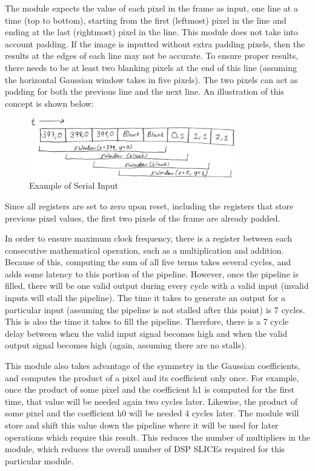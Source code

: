 The module expects the value of each pixel in the frame as input, one line at 
a time (top to bottom), starting from the first (leftmost) pixel in the line and 
ending at the last (rightmost) pixel in the line. This module does not take into 
account padding. If the image is inputted without extra padding pixels, then the 
results at the edges of each line may not be accurate. To ensure proper results, 
there needs to be at least two blanking pixels at the end of this line (assuming 
the horizontal Gaussian window takes in five pixels). The two pixels can act as 
padding for both the previous line and the next line. An illustration of this 
concept is shown below:

\begin{figure}
    \centering
    \includegraphics[width=0.8\textwidth]{processed_image_pngs/serial_input.png}
    \caption{Example of Serial Input}
    \label{fig:serial}
\end{figure}

Since all registers are set to 
zero upon reset, including the registers that store previous pixel values, the 
first two pixels of the frame are already padded.

In order to ensure maximum clock frequency, there is a register between each 
consecutive mathematical operation, such as a multiplication and addition. 
Because of this, computing the sum of all five terms takes several cycles, and 
adds some latency to this portion of the pipeline. However, once the pipeline is 
filled, there will be one valid output during every cycle with a valid input 
(invalid inputs will stall the pipeline). The time it takes to generate an 
output for a particular input (assuming the pipeline is not stalled after this 
point) is 7 cycles. This is also the time it takes to fill the pipeline. 
Therefore, there is a 7 cycle delay between when the valid input signal becomes 
high and when the valid output signal becomes high (again, assuming there are no 
stalls).

This module also takes advantage of the symmetry in the Gaussian coefficients, 
and computes the product of a pixel and its coefficient only once. For example, 
once the product of some pixel and the coefficient h1 is computed for the first 
time, that value will be needed again two cycles later. Likewise, the product of 
some pixel and the coefficient h0 will be needed 4 cycles later. The module will 
store and shift this value down the pipeline where it will be used for later 
operations which require this result. This reduces the number of multipliers in 
the module, which reduces the overall number of DSP SLICEs required for this 
particular module.

